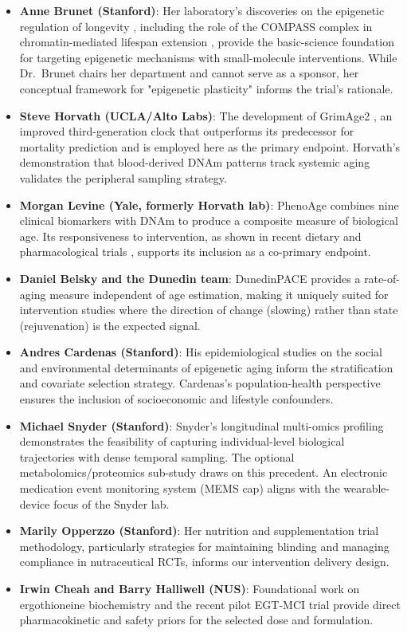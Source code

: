 \documentclass[11pt,a4paper]{article}
\begin{document}
\begin{itemize}[nosep]
  \item \textbf{Anne Brunet (Stanford)}: Her laboratory's discoveries on the epigenetic regulation of longevity \cite{brunet2023}, including the role of the COMPASS complex in chromatin-mediated lifespan extension \cite{silvagarcia2023}, provide the basic-science foundation for targeting epigenetic mechanisms with small-molecule interventions. While Dr.~Brunet chairs her department and cannot serve as a sponsor, her conceptual framework for "epigenetic plasticity" informs the trial's rationale.
  \item \textbf{Steve Horvath (UCLA/Alto Labs)}: The development of GrimAge2 \cite{lu2022}, an improved third-generation clock that outperforms its predecessor \cite{lu2019} for mortality prediction and is employed here as the primary endpoint. Horvath's demonstration that blood-derived DNAm patterns track systemic aging validates the peripheral sampling strategy.
  \item \textbf{Morgan Levine (Yale, formerly Horvath lab)}: PhenoAge \cite{levine2018} combines nine clinical biomarkers with DNAm to produce a composite measure of biological age. Its responsiveness to intervention, as shown in recent dietary and pharmacological trials \cite{kou2025}, supports its inclusion as a co-primary endpoint.
  \item \textbf{Daniel Belsky and the Dunedin team}: DunedinPACE \cite{belsky2022} provides a rate-of-aging measure independent of age estimation, making it uniquely suited for intervention studies where the direction of change (slowing) rather than state (rejuvenation) is the expected signal.
  \item \textbf{Andres Cardenas (Stanford)}: His epidemiological studies on the social and environmental determinants of epigenetic aging \cite{cardenas2022} inform the stratification and covariate selection strategy. Cardenas's population-health perspective ensures the inclusion of socioeconomic and lifestyle confounders.
  \item \textbf{Michael Snyder (Stanford)}: Snyder's longitudinal multi-omics profiling \cite{snyder2019} demonstrates the feasibility of capturing individual-level biological trajectories with dense temporal sampling. The optional metabolomics/proteomics sub-study draws on this precedent. An electronic medication event monitoring system (MEMS cap) aligns with the wearable-device focus of the Snyder lab.
  \item \textbf{Marily Opperzzo (Stanford)}: Her nutrition and supplementation trial methodology, particularly strategies for maintaining blinding and managing compliance in nutraceutical RCTs, informs our intervention delivery design.
  \item \textbf{Irwin Cheah and Barry Halliwell (NUS)}: Foundational work on ergothioneine biochemistry and the recent pilot EGT-MCI trial \cite{yau2024} provide direct pharmacokinetic and safety priors for the selected dose and formulation.
\end{itemize}
\end{document}
